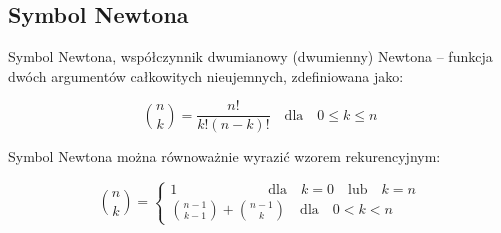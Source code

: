 \documentclass{article}
\begin{document}
\subsection{Symbol Newtona}
Symbol Newtona, współczynnik dwumianowy (dwumienny) Newtona – funkcja dwóch argumentów całkowitych nieujemnych, zdefiniowana jako:

\begin{equation}
	{{n}\choose{k}}=\frac{n!}{k!(n-k)!} \quad \mathrm{dla} \quad 0\le k \leq n
\end{equation}

Symbol Newtona można równoważnie wyrazić wzorem rekurencyjnym:

\begin{equation}
{{n}\choose{k}}=
\begin{cases}
1 \quad \quad \quad \quad \quad \quad \,\,\, \mathrm{dla} \quad k=0 \quad \mathrm{lub} \quad k=n\\
{{n-1}\choose{k-1}}+{{n-1}\choose{k}}\quad \mathrm{dla} \quad 0 < k < n
\end{cases}
\end{equation}


\newpage
\tableofcontents
\end{document}

